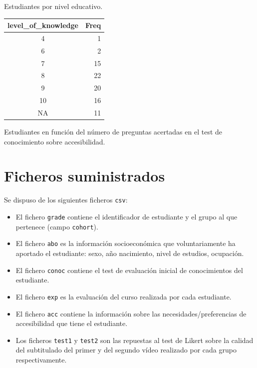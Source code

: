 \documentclass[
  12pt,
  a4paper,
  extrafontsizes,
  onecolumn,
  openright]{memoir}
\providecommand{\tightlist}{%
  \setlength{\itemsep}{0pt}\setlength{\parskip}{0pt}}\usepackage{longtable,booktabs,array}
\begin{document}
\begin{table}
\begin{minipage}[t]{0.50\linewidth}
{Estudiantes por nivel educativo.

}

\end{minipage}%
%
\begin{minipage}[t]{0.50\linewidth}

{\centering 

\hypertarget{tbl-contingencia-eco-4}{}
\begin{longtable}{cr}
\tabularnewline

\toprule
level\_of\_knowledge & Freq \\ 
\midrule
4 & 1 \\ 
6 & 2 \\ 
7 & 15 \\ 
8 & 22 \\ 
9 & 20 \\ 
10 & 16 \\ 
NA & 11 \\ 
\bottomrule
\end{longtable}

Estudiantes en función del número de preguntas acertadas en el test de
conocimiento sobre accesibilidad.

}

\end{minipage}%

\end{table}

\hypertarget{ficheros-suministrados}{%
\section{Ficheros suministrados}\label{ficheros-suministrados}}

Se dispuso de los siguientes ficheros \texttt{csv}:

\begin{itemize}
\tightlist
\item
  El fichero \texttt{grade} contiene el identificador de estudiante y el
  grupo al que pertenece (campo \texttt{cohort}).
\item
  El fichero \texttt{abo} es la información socioeconómica que
  voluntariamente ha aportado el estudiante: sexo, año nacimiento, nivel
  de estudios, ocupación.
\item
  El fichero \texttt{conoc} contiene el test de evaluación inicial de
  conocimientos del estudiante.
\item
  El fichero \texttt{exp} es la evaluación del curso realizada por cada
  estudiante.
\item
  El fichero \texttt{acc} contiene la información sobre las
  necesidades/preferencias de accesibilidad que tiene el estudiante.
\item
  Los ficheros \texttt{test1} y \texttt{test2} son las repuestas al test
  de Likert sobre la calidad del subtitulado del primer y del segundo
  vídeo realizado por cada grupo respectivamente.
\end{itemize}
\end{document}

